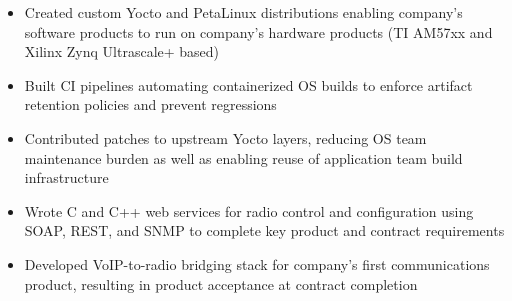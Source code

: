 \begin{itemize}
    \item Created custom Yocto and PetaLinux distributions enabling company's software products to run on company's hardware products (TI AM57xx and Xilinx Zynq Ultrascale+ based)
    \item Built CI pipelines automating containerized OS builds to enforce artifact retention policies and prevent regressions
    \item Contributed patches to upstream Yocto layers, reducing OS team maintenance burden as well as enabling reuse of application team build infrastructure
    \item Wrote C and C++ web services for radio control and configuration using SOAP, REST, and SNMP to complete key product and contract requirements
    \item Developed VoIP-to-radio bridging stack for company's first communications product, resulting in product acceptance at contract completion
\end{itemize}
